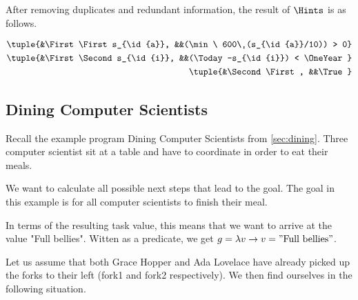 After removing duplicates and redundant information, the result of $\Hints$ is as follows.

\begin{align*}
  \tuple{&\First \First s_{\id{a}},  &&(\min\ 600\ (s_{\id{a}}/10)) > 0} &\\
  \tuple{&\First \Second s_{\id{i}}, &&(\Today-s_{\id{i}}) < \OneYear} &\\
  \tuple{&\Second \First,            &&\True} &
\end{align*}



\subsection{Dining Computer Scientists}
\label{sec:assistivedining}

Recall the example program Dining Computer Scientists from \cref{sec:dining}.
Three computer scientist sit at a table and have to coordinate in order to eat their meals.

We want to calculate all possible next steps that lead to the goal.
The goal in this example is for all computer scientists to finish their meal.

In terms of the resulting task value, this means that we want to arrive at the value "Full bellies".
Witten as a predicate, we get $g=\lambda v\rightarrow v = "\text{Full bellies}"$.

Let us assume that both Grace Hopper and Ada Lovelace have already picked up the forks to their left (fork1 and fork2 respectively).
We then find ourselves in the following situation.


